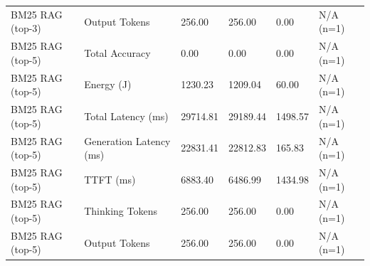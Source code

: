 \begin{table}
\begin{tabular}{llllll}
BM25 RAG (top-3) & Output Tokens & 256.00 & 256.00 & 0.00 & N/A (n=1) \\
BM25 RAG (top-5) & Total Accuracy & 0.00 & 0.00 & 0.00 & N/A (n=1) \\
BM25 RAG (top-5) & Energy (J) & 1230.23 & 1209.04 & 60.00 & N/A (n=1) \\
BM25 RAG (top-5) & Total Latency (ms) & 29714.81 & 29189.44 & 1498.57 & N/A (n=1) \\
BM25 RAG (top-5) & Generation Latency (ms) & 22831.41 & 22812.83 & 165.83 & N/A (n=1) \\
BM25 RAG (top-5) & TTFT (ms) & 6883.40 & 6486.99 & 1434.98 & N/A (n=1) \\
BM25 RAG (top-5) & Thinking Tokens & 256.00 & 256.00 & 0.00 & N/A (n=1) \\
BM25 RAG (top-5) & Output Tokens & 256.00 & 256.00 & 0.00 & N/A (n=1) \\
\bottomrule
\end{tabular}
\end{table}
